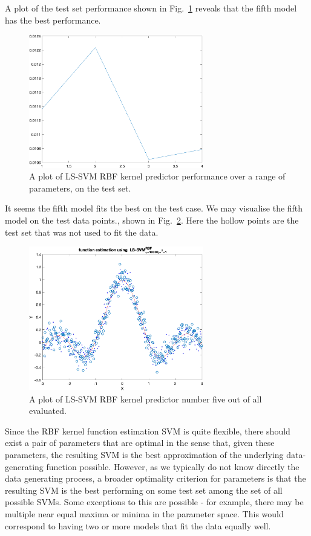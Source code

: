\documentclass[10pt,a4paper]{article}
\begin{document}
A plot of the test set performance shown in Fig.~\ref{fig:RBFtestsetPerf} reveals that the fifth model has the best performance.

\begin{figure}[h!]
  \includegraphics[width=3in]{RBFtestsetPerf.png}
  \caption{A plot of LS-SVM RBF kernel predictor performance over a range of parameters, on the test set.}
  \label{fig:RBFtestsetPerf}
\end{figure}

It seems the fifth model fits the best on the test case. We may visualise the fifth model on the test data points., shown in Fig.~\ref{fig:fifthModelPlot}. Here the hollow points are the test set that was not used to fit the data.

\begin{figure}[h!]
  \includegraphics[width=3in]{fifthModelPlot.png}
  \caption{A plot of LS-SVM RBF kernel predictor number five out of all evaluated.}
  \label{fig:fifthModelPlot}
\end{figure}

Since the RBF kernel function estimation SVM is quite flexible, there should exist a pair of parameters that are optimal in the sense that, given these parameters, the resulting SVM is the best approximation of the underlying data-generating function possible. However, as we typically do not know directly the data generating process, a broader optimality criterion for parameters is that the resulting SVM is the best performing on some test set among the set of all possible SVMs. Some exceptions to this are possible - for example, there may be multiple near equal maxima or minima in the parameter space. This would correspond to having two or more models that fit the data equally well.
\end{document}
